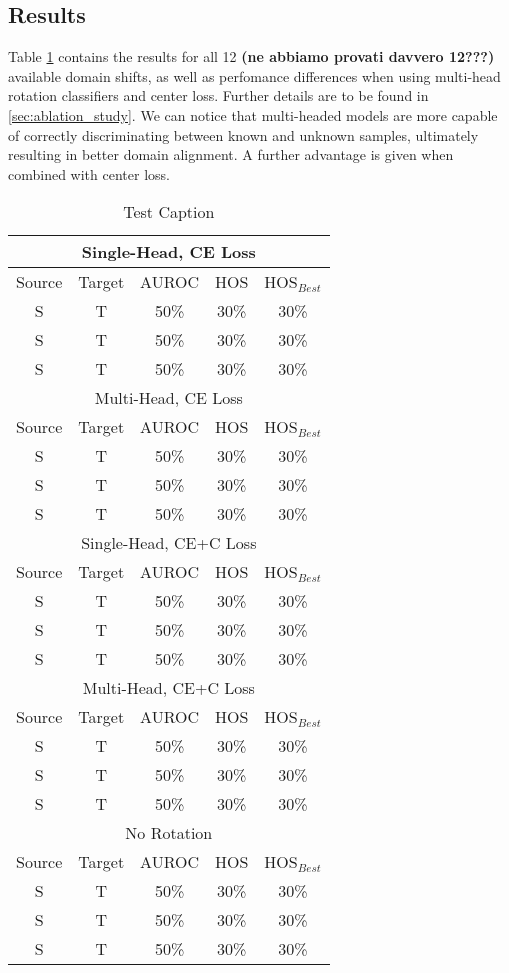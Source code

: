 \documentclass[10pt,twocolumn,letterpaper]{article}
\begin{document}
\subsection{Results}
\label{sec:results}
Table \ref{tab:results} contains the results for all 12 {\bf (ne abbiamo provati davvero 12???)} available domain shifts,
as well as perfomance differences when using multi-head rotation classifiers and center loss.
Further details are to be found in \ref{sec:ablation_study}.
We can notice that multi-headed models are more capable of correctly discriminating between known and unknown samples,
ultimately resulting in better domain alignment.
A further advantage is given when combined with center loss.


\begin{table}
  \centering
  \begin{tabular}[t]{||c|c|c||c|c||}
    \hline
    \multicolumn{5}{||c||}{Single-Head, CE Loss} \\
    \hline
    Source & Target & AUROC & HOS & HOS$_{Best}$ \\
    S & T & 50\% & 30\% & 30\% \\
    S & T & 50\% & 30\% & 30\% \\
    S & T & 50\% & 30\% & 30\% \\
    \hline
    \hline
    \multicolumn{5}{||c||}{Multi-Head, CE Loss} \\
    \hline
    Source & Target & AUROC & HOS & HOS$_{Best}$ \\
    S & T & 50\% & 30\% & 30\% \\
    S & T & 50\% & 30\% & 30\% \\
    S & T & 50\% & 30\% & 30\% \\
    \hline
    \hline
    \multicolumn{5}{||c||}{Single-Head, CE+C Loss} \\
    \hline
    Source & Target & AUROC & HOS & HOS$_{Best}$ \\
    S & T & 50\% & 30\% & 30\% \\
    S & T & 50\% & 30\% & 30\% \\
    S & T & 50\% & 30\% & 30\% \\
    \hline
    \hline
    \multicolumn{5}{||c||}{Multi-Head, CE+C Loss} \\
    \hline
    Source & Target & AUROC & HOS & HOS$_{Best}$ \\
    S & T & 50\% & 30\% & 30\% \\
    S & T & 50\% & 30\% & 30\% \\
    S & T & 50\% & 30\% & 30\% \\
    \hline 
    \hline
    \multicolumn{5}{||c||}{No Rotation} \\
    \hline
    Source & Target & AUROC & HOS & HOS$_{Best}$ \\
    S & T & 50\% & 30\% & 30\% \\
    S & T & 50\% & 30\% & 30\% \\
    S & T & 50\% & 30\% & 30\% \\
    \hline
  \end{tabular}
  \caption{\label{tab:results}Test Caption}
\end{table}
\end{document}
